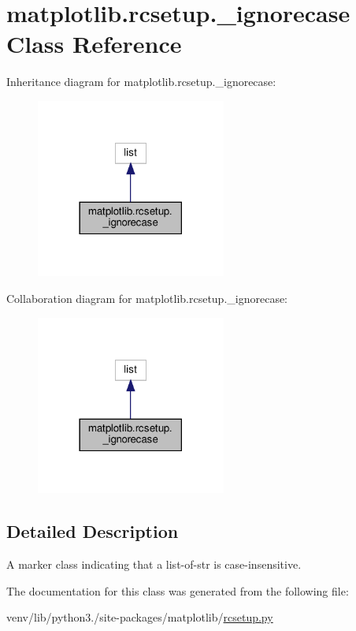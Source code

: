 \hypertarget{classmatplotlib_1_1rcsetup_1_1__ignorecase}{}\section{matplotlib.\+rcsetup.\+\_\+ignorecase Class Reference}
\label{classmatplotlib_1_1rcsetup_1_1__ignorecase}


Inheritance diagram for matplotlib.\+rcsetup.\+\_\+ignorecase\+:
\nopagebreak
\begin{figure}[H]
\begin{center}
\leavevmode
\includegraphics[width=177pt]{classmatplotlib_1_1rcsetup_1_1__ignorecase__inherit__graph}
\end{center}
\end{figure}


Collaboration diagram for matplotlib.\+rcsetup.\+\_\+ignorecase\+:
\nopagebreak
\begin{figure}[H]
\begin{center}
\leavevmode
\includegraphics[width=177pt]{classmatplotlib_1_1rcsetup_1_1__ignorecase__coll__graph}
\end{center}
\end{figure}


\subsection{Detailed Description}
\begin{DoxyVerb}A marker class indicating that a list-of-str is case-insensitive.\end{DoxyVerb}
 

The documentation for this class was generated from the following file\+:\begin{DoxyCompactItemize}
\item 
venv/lib/python3./site-\/packages/matplotlib/\hyperlink{rcsetup_8py}{rcsetup.\+py}\end{DoxyCompactItemize}
